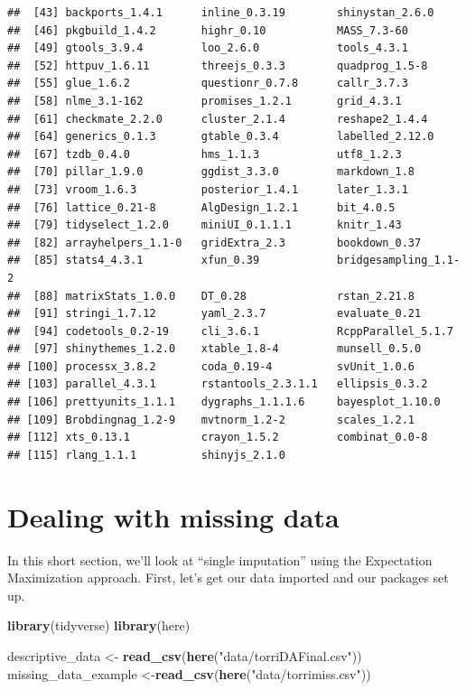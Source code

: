 \documentclass[
]{book}
\newenvironment{Shaded}{\begin{snugshade}}{\end{snugshade}}
\newcommand{\FunctionTok}[1]{\textcolor[rgb]{0.13,0.29,0.53}{\textbf{#1}}}
\newcommand{\NormalTok}[1]{#1}
\newcommand{\OtherTok}[1]{\textcolor[rgb]{0.56,0.35,0.01}{#1}}
\newcommand{\StringTok}[1]{\textcolor[rgb]{0.31,0.60,0.02}{#1}}
\begin{document}
\begin{verbatim}
##  [43] backports_1.4.1      inline_0.3.19        shinystan_2.6.0     
##  [46] pkgbuild_1.4.2       highr_0.10           MASS_7.3-60         
##  [49] gtools_3.9.4         loo_2.6.0            tools_4.3.1         
##  [52] httpuv_1.6.11        threejs_0.3.3        quadprog_1.5-8      
##  [55] glue_1.6.2           questionr_0.7.8      callr_3.7.3         
##  [58] nlme_3.1-162         promises_1.2.1       grid_4.3.1          
##  [61] checkmate_2.2.0      cluster_2.1.4        reshape2_1.4.4      
##  [64] generics_0.1.3       gtable_0.3.4         labelled_2.12.0     
##  [67] tzdb_0.4.0           hms_1.1.3            utf8_1.2.3          
##  [70] pillar_1.9.0         ggdist_3.3.0         markdown_1.8        
##  [73] vroom_1.6.3          posterior_1.4.1      later_1.3.1         
##  [76] lattice_0.21-8       AlgDesign_1.2.1      bit_4.0.5           
##  [79] tidyselect_1.2.0     miniUI_0.1.1.1       knitr_1.43          
##  [82] arrayhelpers_1.1-0   gridExtra_2.3        bookdown_0.37       
##  [85] stats4_4.3.1         xfun_0.39            bridgesampling_1.1-2
##  [88] matrixStats_1.0.0    DT_0.28              rstan_2.21.8        
##  [91] stringi_1.7.12       yaml_2.3.7           evaluate_0.21       
##  [94] codetools_0.2-19     cli_3.6.1            RcppParallel_5.1.7  
##  [97] shinythemes_1.2.0    xtable_1.8-4         munsell_0.5.0       
## [100] processx_3.8.2       coda_0.19-4          svUnit_1.0.6        
## [103] parallel_4.3.1       rstantools_2.3.1.1   ellipsis_0.3.2      
## [106] prettyunits_1.1.1    dygraphs_1.1.1.6     bayesplot_1.10.0    
## [109] Brobdingnag_1.2-9    mvtnorm_1.2-2        scales_1.2.1        
## [112] xts_0.13.1           crayon_1.5.2         combinat_0.0-8      
## [115] rlang_1.1.1          shinyjs_2.1.0
\end{verbatim}

\chapter{Dealing with missing data}\label{dealing-with-missing-data}

In this short section, we'll look at ``single imputation'' using the Expectation Maximization approach. First, let's get our data imported and our packages set up.

\begin{Shaded}
\begin{Highlighting}[]
\FunctionTok{library}\NormalTok{(tidyverse)}
\FunctionTok{library}\NormalTok{(here)}

\NormalTok{descriptive\_data }\OtherTok{\textless{}{-}} \FunctionTok{read\_csv}\NormalTok{(}\FunctionTok{here}\NormalTok{(}\StringTok{"data/torriDAFinal.csv"}\NormalTok{))}
\NormalTok{missing\_data\_example }\OtherTok{\textless{}{-}}\FunctionTok{read\_csv}\NormalTok{(}\FunctionTok{here}\NormalTok{(}\StringTok{"data/torrimiss.csv"}\NormalTok{))}
\end{Highlighting}
\end{Shaded}
\end{document}
